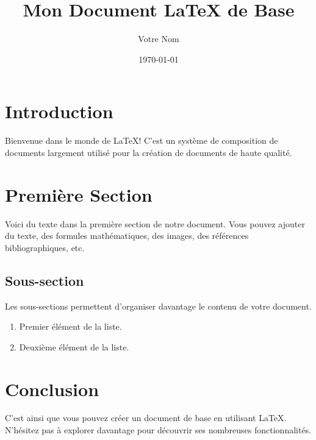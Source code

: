 \documentclass{article}
\begin{document}
\title{Mon Document LaTeX de Base}
\author{Votre Nom}
\date{\today}

\maketitle

\section{Introduction}
Bienvenue dans le monde de \LaTeX! C'est un système de composition de documents largement utilisé pour la création de documents de haute qualité.

\section{Première Section}
Voici du texte dans la première section de notre document. Vous pouvez ajouter du texte, des formules mathématiques, des images, des références bibliographiques, etc.

\subsection{Sous-section}
Les sous-sections permettent d'organiser davantage le contenu de votre document.

\begin{enumerate}
  \item Premier élément de la liste.
  \item Deuxième élément de la liste.
\end{enumerate}

\section{Conclusion}
C'est ainsi que vous pouvez créer un document de base en utilisant \LaTeX. N'hésitez pas à explorer davantage pour découvrir ses nombreuses fonctionnalités.
\end{document}
